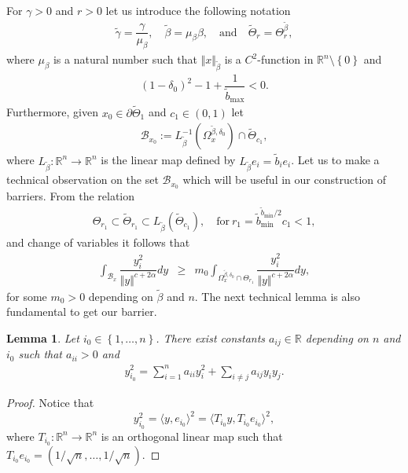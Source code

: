 \documentclass[10pt, leqno]{article}
\newtheorem{lemma}[theorem]{Lemma}
\theoremstyle{definition}
\theoremstyle{remark}
\numberwithin{equation}{section}
\begin{document}
For $\gamma > 0$ and $r>0$ let us introduce the following notation
\begin{eqnarray}
\label{tilde notation}
\tilde{\gamma} = \dfrac{\gamma}{\mu_{\beta}},\quad \tilde{\beta} = \mu_{\beta} \beta, \quad  \text{and} \quad \tilde{\Theta}_{r} = \Theta^{\tilde{\beta}}_{r},
\end{eqnarray}
where $\mu_{\beta}$ is a natural number such that $\Vert x \Vert_{\tilde{\beta}}$ is a $C^{2}$-function in $\mathbb{R}^{n} \setminus \left\lbrace 0 \right\rbrace$ and
\begin{eqnarray}
\label{condition on mu beta geometric asymptotic condition on alpha}
 \left( 1 - \delta_{0} \right)^{2} - 1 + \dfrac{1}{\tilde{b}_{\max}} < 0.
\end{eqnarray}
Furthermore, given $x_{0} \in \partial \tilde{\Theta}_{1}$ and $c_{1} \in \left(0, 1 \right)$ let
\begin{eqnarray}
\mathcal{B}_{x_{0}} := L^{-1}_{\tilde{\beta}}\left( \Omega^{\tilde{\beta}, \delta_{0}}_{x} \right) \cap \tilde{\Theta}_{c_{1}},
\end{eqnarray}
where $L_{\tilde{\beta}}: \mathbb{R}^{n} \rightarrow \mathbb{R}^{n}$ is the linear map defined by $L_{\tilde{\beta}} e_{i} =  \tilde{b}_{i} e_{i}$. Let us to make a technical observation on the set $\mathcal{B}_{x_{0}}$ which will be useful in our construction of barriers. From the relation
\begin{eqnarray}
\Theta_{r_{1}} \subset \tilde{\Theta}_{r_{1}} \subset L^{}_{\tilde{\beta}}(\tilde{\Theta}_{c_{1}}), \quad \text{for} \ r_{1} = \tilde{b}^{\tilde{b}_{\min}/2}_{\min}c_{1} < 1,
\end{eqnarray}
and change of variables it follows that
\begin{eqnarray}
\label{technical barrier integral estimate}
\int_{\mathcal{B}_{x}} \dfrac{y^{2}_{i}}{\Vert y \Vert^{c+2\alpha}} dy & \geq & m_{0}\int_{\Omega^{\tilde{\beta}, \delta_{0}}_{x}\cap \Theta_{r_{1}}} \dfrac{y^{2}_{i_{}}}{\Vert y \Vert^{c+2\alpha}} dy,
\end{eqnarray}
for some $m_{0} > 0$ depending on $\tilde{\beta}$ and $n$. The next technical lemma is also fundamental to get our barrier.
\begin{lemma}
\label{technical lemma barrier}
Let $i_{0} \in \left\lbrace 1, \dots, n \right\rbrace$. There exist constants $a_{ij}\in \mathbb{R}$ depending on $n$ and $i_{0}$ such that $a_{ii} > 0$ and
\begin{eqnarray}
\label{technical lemma barrier inequality}
y^{2}_{i_{0}} = \sum_{i=1}^{n} a_{ii}y_{i}^{2} + \sum_{i\neq j}^{} a_{ij} y_{i}y_{j}.
\end{eqnarray}
\end{lemma}
\begin{proof}
Notice that
\begin{equation}
y^{2}_{i_{0}} = \langle y, e_{i_{0}}\rangle^{2} = \langle T_{i_{0}}y, T_{i_{0}} e_{i_{0}}\rangle^{2},
\end{equation}
where $T_{i_{0}}: \mathbb{R}^{n} \rightarrow \mathbb{R}^{n}$ is an orthogonal linear map such that
$T_{i_{0}}e_{i_{0}} = \left(1/\sqrt{n}, \dots, 1/\sqrt{n} \right)$.
\end{proof}
\end{document}
